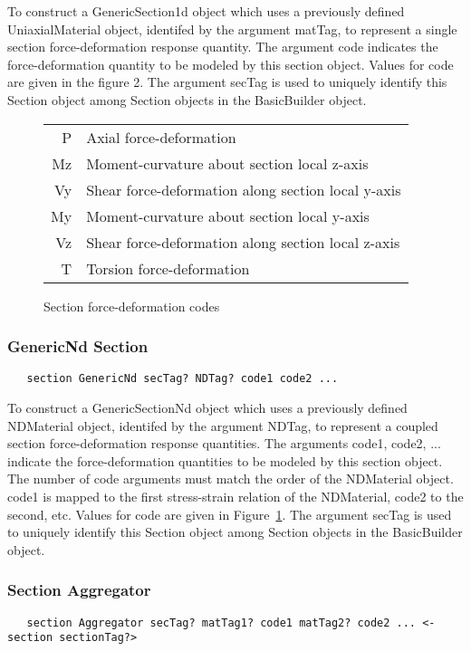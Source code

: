 \documentclass[12pt]{article}
\begin{document}
To construct a GenericSection1d object which uses a previously defined
UniaxialMaterial object, identifed by the argument matTag, to represent
a single section force-deformation response quantity. The argument code indicates
the force-deformation quantity to be modeled by this section object.
Values for code are given in the figure 2. The 
argument secTag is used to uniquely identify this Section object among 
Section objects in the BasicBuilder object. 

\begin{figure}[htpb]
\begin{center}
\begin{tabular}{||r|l||} \hline
 P & Axial force-deformation \\
 Mz & Moment-curvature about section local z-axis \\
 Vy & Shear force-deformation along section local y-axis \\
 My & Moment-curvature about section local y-axis \\
 Vz & Shear force-deformation along section local z-axis \\
 T & Torsion force-deformation \\ \hline
\end{tabular}
\caption{Section force-deformation codes}
\label{sectionCodes}
\end{center}
\end{figure}

\subsubsection{GenericNd Section}
{\sf\small
\begin{verbatim}
   section GenericNd secTag? NDTag? code1 code2 ...
\end{verbatim}
}

To construct a GenericSectionNd object which uses a previously defined
NDMaterial object, identifed by the argument NDTag, to represent
a coupled section force-deformation response quantities. The arguments code1, 
code2, ... indicate the force-deformation quantities to be modeled by
this section object. The number of code arguments must match the order
of the NDMaterial object. code1 is mapped to the first stress-strain
relation of the NDMaterial, code2 to the second, etc. Values for code
are given in Figure~\ref{sectionCodes}. The argument secTag is used to
uniquely identify this Section object among Section objects in the
BasicBuilder object. 

\subsubsection{Section Aggregator}
{\sf\small
\begin{verbatim}
   section Aggregator secTag? matTag1? code1 matTag2? code2 ... <-section sectionTag?>
\end{verbatim}
}
\end{document}
